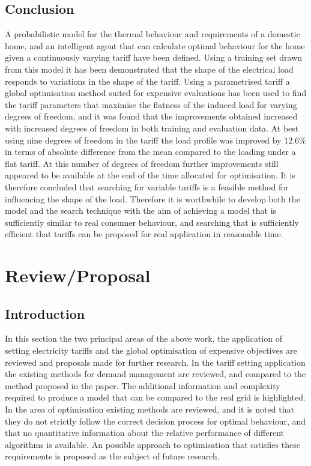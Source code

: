 \documentclass[a4paper, 10 pt, conference]{ieeeconf}  %
\begin{document}
\subsection{Conclusion}
A probabilistic model for the thermal behaviour and requirements of a domestic home, and an intelligent agent that can calculate optimal behaviour for the home given a continuously varying tariff have been defined. Using a training set drawn from this model it has been demonstrated that the shape of the electrical load responds to variations in the shape of the tariff. Using a parametrised tariff a global optimisation method suited for expensive evaluations has been used to find the tariff parameters that maximise the flatness of the induced load for varying degrees of freedom, and it was found that the improvements obtained increased with increased degrees of freedom in both training and evaluation data. At best using nine degrees of freedom in the tariff the load profile was improved by $12.6\%$ in terms of absolute difference from the mean compared to the loading under a flat tariff. At this number of degrees of freedom further improvements still appeared to be available at the end of the time allocated for optimisation. It is therefore concluded that searching for variable tariffs is a feasible method for influencing the shape of the load. Therefore it is worthwhile to develop both the model and the search technique with the aim of achieving a model that is sufficiently similar to real consumer behaviour, and searching that is sufficiently efficient that tariffs can be proposed for real application in reasonable time. 







\onecolumn
\large
\section{Review/Proposal}
\doublespacing
\subsection{Introduction}
In this section the two principal areas of the above work, the application of setting electricity tariffs and the global optimisation of expensive objectives are reviewed and proposals made for further research.
In the tariff setting application the existing methods for demand management are reviewed, and compared to the method proposed in the paper. The additional information and complexity required to produce a model that can be compared to the real grid is highlighted.
In the area of optimisation existing methods are reviewed, and it is noted that they do not strictly follow the correct decision process for optimal behaviour, and that no quantitative information about the relative performance of different algorithms is available. An possible approach to optimisation that satisfies these requirements is proposed as the subject of future research.
\end{document}
